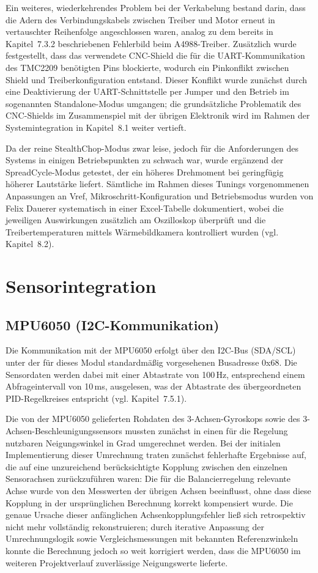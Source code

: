 \documentclass[12pt,ngerman,numbers=noenddot,abstracton,headsepline]{scrreprt}
\begin{document}
Ein weiteres, wiederkehrendes Problem bei der Verkabelung bestand darin, dass die Adern des Verbindungskabels zwischen Treiber und Motor erneut in vertauschter Reihenfolge angeschlossen waren, analog zu dem bereits in Kapitel~7.3.2 beschriebenen Fehlerbild beim A4988-Treiber. Zusätzlich wurde festgestellt, dass das verwendete CNC-Shield die für die UART-Kommunikation des TMC2209 benötigten Pins blockierte, wodurch ein Pinkonflikt zwischen Shield und Treiberkonfiguration entstand. Dieser Konflikt wurde zunächst durch eine Deaktivierung der UART-Schnittstelle per Jumper und den Betrieb im sogenannten Standalone-Modus umgangen; die grundsätzliche Problematik des CNC-Shields im Zusammenspiel mit der übrigen Elektronik wird im Rahmen der Systemintegration in Kapitel~8.1 weiter vertieft.

Da der reine StealthChop-Modus zwar leise, jedoch für die Anforderungen des Systems in einigen Betriebspunkten zu schwach war, wurde ergänzend der SpreadCycle-Modus getestet, der ein höheres Drehmoment bei geringfügig höherer Lautstärke liefert. Sämtliche im Rahmen dieses Tunings vorgenommenen Anpassungen an Vref, Mikroschritt-Konfiguration und Betriebsmodus wurden von Felix Dauerer systematisch in einer Excel-Tabelle dokumentiert, wobei die jeweiligen Auswirkungen zusätzlich am Oszilloskop überprüft und die Treibertemperaturen mittels Wärmebildkamera kontrolliert wurden (vgl. Kapitel~8.2).

\section{Sensorintegration}
\label{sec:sensorintegration}

\subsection{MPU6050 (I2C-Kommunikation)}
\label{subsec:mpu6050_i2c}

Die Kommunikation mit der MPU6050 erfolgt über den I2C-Bus (SDA/SCL) unter der für dieses Modul standardmäßig vorgesehenen Busadresse 0x68. Die Sensordaten werden dabei mit einer Abtastrate von 100\,Hz, entsprechend einem Abfrageintervall von 10\,ms, ausgelesen, was der Abtastrate des übergeordneten PID-Regelkreises entspricht (vgl. Kapitel~7.5.1).

Die von der MPU6050 gelieferten Rohdaten des 3-Achsen-Gyroskops sowie des 3-Achsen-Beschleunigungssensors mussten zunächst in einen für die Regelung nutzbaren Neigungswinkel in Grad umgerechnet werden. Bei der initialen Implementierung dieser Umrechnung traten zunächst fehlerhafte Ergebnisse auf, die auf eine unzureichend berücksichtigte Kopplung zwischen den einzelnen Sensorachsen zurückzuführen waren: Die für die Balancierregelung relevante Achse wurde von den Messwerten der übrigen Achsen beeinflusst, ohne dass diese Kopplung in der ursprünglichen Berechnung korrekt kompensiert wurde. Die genaue Ursache dieser anfänglichen Achsenkopplungsfehler ließ sich retrospektiv nicht mehr vollständig rekonstruieren; durch iterative Anpassung der Umrechnungslogik sowie Vergleichsmessungen mit bekannten Referenzwinkeln konnte die Berechnung jedoch so weit korrigiert werden, dass die MPU6050 im weiteren Projektverlauf zuverlässige Neigungswerte lieferte.
\end{document}
